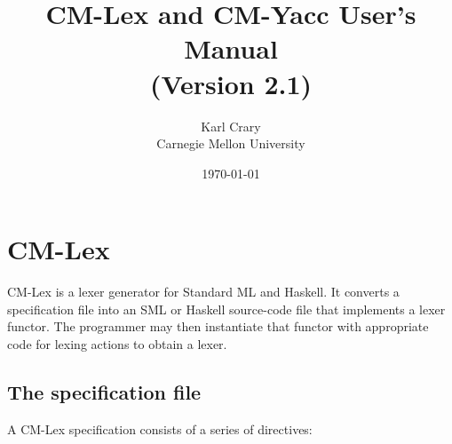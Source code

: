 \documentclass[10pt]{article}
\title{CM-Lex and CM-Yacc User's Manual \\ \Large
(Version 2.1)}
\author{Karl Crary \\ Carnegie Mellon University}
\date{\today}
\begin{document}
\maketitle

\section{CM-Lex}

CM-Lex is a lexer generator for Standard ML and Haskell.  It converts
a specification file into an SML or Haskell source-code file that
implements a lexer functor.  The programmer may then instantiate that
functor with appropriate code for lexing actions to obtain a lexer.

\subsection{The specification file}

A CM-Lex specification consists of a series of directives:
\end{document}
